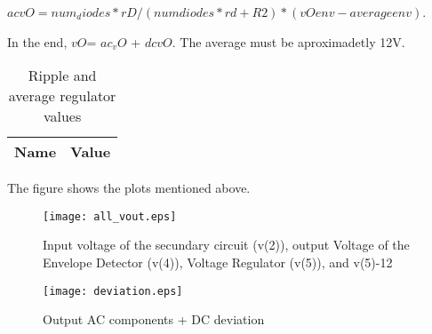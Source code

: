 \par $acvO = num_diodes*rD/(numdiodes*rd+R2) * (vOenv-averageenv)$. 

\par In the end, $vO$= $ac_vO$ + $dcvO$. The average must be aproximadetly 12V.

\begin{table}[ht]
  \centering
  \begin{tabular}{|l|r|}
    \hline    
    {\bf Name} & {\bf Value} \\ \hline
    
  \end{tabular}
  \caption{Ripple and average regulator values}
  \label{tab:p2}
\end{table}


The figure shows the plots mentioned above.

\begin{figure}[h] \centering
\texttt{[image: all\_vout.eps]}
\caption{Input voltage of the secundary circuit (v(2)), output Voltage of the Envelope Detector (v(4)), Voltage Regulator (v(5)), and v(5)-12}
\label{sim3}
\end{figure}


\begin{figure}[h] \centering
\texttt{[image: deviation.eps]}
\caption{Output AC components + DC deviation}
\label{sim3}
\end{figure}
















